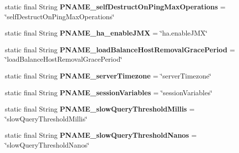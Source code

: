 \begin{DoxyCompactItemize}
\item 
\mbox{\label{classcom_1_1mysql_1_1cj_1_1conf_1_1_property_definitions_a75d1b9ca970311e0fab34d31576c8d1f}} 
static final String {\bfseries P\+N\+A\+M\+E\+\_\+self\+Destruct\+On\+Ping\+Max\+Operations} = \char`\"{}self\+Destruct\+On\+Ping\+Max\+Operations\char`\"{}
\item 
\mbox{\label{classcom_1_1mysql_1_1cj_1_1conf_1_1_property_definitions_a2920346257a2623344f9951c68824e8b}} 
static final String {\bfseries P\+N\+A\+M\+E\+\_\+ha\+\_\+enable\+J\+MX} = \char`\"{}ha.\+enable\+J\+MX\char`\"{}
\item 
\mbox{\label{classcom_1_1mysql_1_1cj_1_1conf_1_1_property_definitions_ab30ebba7896dc536afffbaca33a44b96}} 
static final String {\bfseries P\+N\+A\+M\+E\+\_\+load\+Balance\+Host\+Removal\+Grace\+Period} = \char`\"{}load\+Balance\+Host\+Removal\+Grace\+Period\char`\"{}
\item 
\mbox{\label{classcom_1_1mysql_1_1cj_1_1conf_1_1_property_definitions_af92182b1c357d44c7482196cb9f3247a}} 
static final String {\bfseries P\+N\+A\+M\+E\+\_\+server\+Timezone} = \char`\"{}server\+Timezone\char`\"{}
\item 
\mbox{\label{classcom_1_1mysql_1_1cj_1_1conf_1_1_property_definitions_a9f08055b35bffcb6fa94fd82aaefd4ac}} 
static final String {\bfseries P\+N\+A\+M\+E\+\_\+session\+Variables} = \char`\"{}session\+Variables\char`\"{}
\item 
\mbox{\label{classcom_1_1mysql_1_1cj_1_1conf_1_1_property_definitions_ae88a78706313fc90ec04ac225dcacfe0}} 
static final String {\bfseries P\+N\+A\+M\+E\+\_\+slow\+Query\+Threshold\+Millis} = \char`\"{}slow\+Query\+Threshold\+Millis\char`\"{}
\item 
\mbox{\label{classcom_1_1mysql_1_1cj_1_1conf_1_1_property_definitions_a77a73467a94603871728ca7979cc6474}} 
static final String {\bfseries P\+N\+A\+M\+E\+\_\+slow\+Query\+Threshold\+Nanos} = \char`\"{}slow\+Query\+Threshold\+Nanos\char`\"{}

\end{DoxyCompactItemize}
